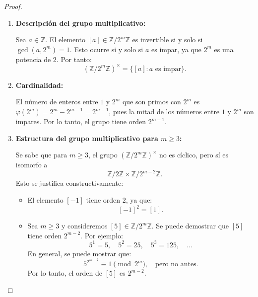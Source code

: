 \begin{ejercicio}
\end{ejercicio}
\begin{proof}
		\leavevmode
		\begin{enumerate}
			\item \textbf{Descripción del grupo multiplicativo:} 
			
			Sea \( a \in \mathbb{Z} \). El elemento \( [a] \in \mathbb{Z}/2^m\mathbb{Z} \) es invertible si y solo si \( \gcd(a, 2^m) = 1 \). Esto ocurre si y solo si \( a \) es impar, ya que \( 2^m \) es una potencia de \( 2 \). Por tanto:
			\[
			(\mathbb{Z}/2^m\mathbb{Z})^\times = \{ [a] : a \text{ es impar} \}.
			\]
			
			\item \textbf{Cardinalidad:}
			
			El número de enteros entre \( 1 \) y \( 2^m \) que son primos con \( 2^m \) es \( \varphi(2^m) = 2^m - 2^{m-1} = 2^{m-1} \), pues la mitad de los números entre \( 1 \) y \( 2^m \) son impares. Por lo tanto, el grupo tiene orden \( 2^{m-1} \).
			
			\item \textbf{Estructura del grupo multiplicativo para \( m \geq 3 \):}
			
			Se sabe que para \( m \geq 3 \), el grupo \( (\mathbb{Z}/2^m\mathbb{Z})^\times \) no es cíclico, pero sí es isomorfo a
			\[
			\mathbb{Z}/2\mathbb{Z} \times \mathbb{Z}/2^{m-2}\mathbb{Z}.
			\]
			Esto se justifica constructivamente:
			
			\begin{itemize}
				\item El elemento \( [-1] \) tiene orden \( 2 \), ya que:
				\[
				[-1]^2 = [1].
				\]
				
				\item Sea \( m \geq 3 \) y consideremos \( [5] \in \mathbb{Z}/2^m\mathbb{Z} \). Se puede demostrar que \( [5] \) tiene orden \( 2^{m-2} \). Por ejemplo:
				\[
				5^1 = 5,\quad 5^2 = 25,\quad 5^3 = 125,\quad \dots
				\]
				En general, se puede mostrar que:
				\[
				5^{2^{m-2}} \equiv 1 \pmod{2^m},\quad \text{pero no antes.}
				\]
				Por lo tanto, el orden de \( [5] \) es \( 2^{m-2} \).
				

\end{itemize}
\end{enumerate}
\end{proof}
